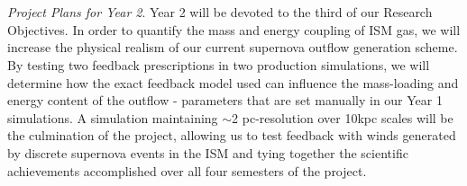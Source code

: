 \documentclass[11pt,letterpaper,english]{article}
\begin{document}
~\\~\\
\textit{Project Plans for Year 2}. Year 2 will be devoted to the third of our Research Objectives. In order to quantify the mass and energy coupling of ISM gas, we will increase the physical realism of our current supernova outflow generation scheme. By testing two feedback prescriptions in two production simulations, we will determine how the exact feedback model used can influence the mass-loading and energy content of the outflow - parameters that are set manually in our Year 1 simulations. A simulation maintaining $\sim$2 pc-resolution over 10kpc scales will be the culmination of the project, allowing us to test feedback with winds generated by discrete supernova events in the ISM and tying together the scientific achievements accomplished over all four semesters of the project.

\end{document}
